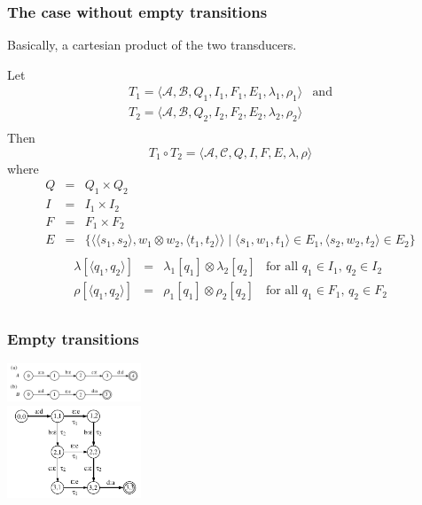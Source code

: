 \documentclass{beamer}
\newcommand{\<}{\langle}
\renewcommand{\>}{\rangle}
\begin{document}
\begin{frame}
  \frametitle{The case without empty transitions}

  Basically, a cartesian product of the two transducers.

  Let 
$$
\begin{array}{ll}
T_1 = \<\mathcal{A}, \mathcal{B}, Q_1, I_1, F_1, E_1, \lambda_1, \rho_1\> &
  \mbox{and} \\
T_2 = \<\mathcal{A}, \mathcal{B}, Q_2, I_2, F_2, E_2, \lambda_2, \rho_2\> \\
\end{array}
$$
Then
$$
T_1 \circ T_2 = \<\mathcal{A}, \mathcal{C}, Q, I, F, E, \lambda, \rho\>
$$
where
$$
\begin{array}{rcll}
  Q & = & Q_1 \times Q_2 \\
  I & = & I_1 \times I_2 \\
  F & = & F_1 \times F_2 \\
  E & = & \{\<\<s_1,s_2\>, w_1 \otimes w_2, \<t_1, t_2\>\> \; | \; \<s_1,w_1,t_1\>
              \in E_1, \<s_2, w_2, t_2\> \in E_2\} \\
\end{array}
$$
$$
\begin{array}{rcll}
  \lambda[\<q_1,q_2\>] & = & \lambda_1[q_1]\otimes\lambda_2[q_2] & \mbox{for
    all $q_1 \in I_1$, $q_2 \in I_2$} \\
  \rho[\<q_1,q_2\>] & = & \rho_1[q_1]\otimes\rho_2[q_2] & \mbox{for
    all $q_1 \in F_1$, $q_2 \in F_2$} \\
\end{array}
$$
\end{frame}

\begin{frame}
  \frametitle{Empty transitions}

  \includegraphics[width=4cm]{composition-example-1.png}\\
  \includegraphics[width=4cm]{composition-example-2.png}

\end{frame}
\end{document}
